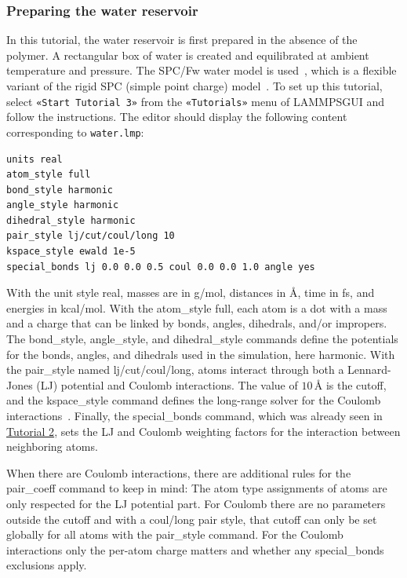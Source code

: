 \documentclass[9pt,tutorial]{livecoms}
\newcommand{\lmpcmd}[1]{\hspace{0pt}\colorbox{listing}{\textcolor{command}{\small{#1}}}\hspace{0pt}} %
\newcommand{\flecmd}[1]{\textcolor{command}{\texttt{#1}}} %
\newcommand{\guicmd}[1]{\textcolor{command}{\texttt{«#1»}}} %
\newcommand{\lammpsgui}{\textsf{LAMMPS\textendash GUI}}
\begin{document}
\subsubsection{Preparing the water reservoir}

In this tutorial, the water reservoir is first prepared in the absence of the polymer.
A rectangular box of water is created and equilibrated at ambient temperature and
pressure.  The SPC/Fw water model is used~\cite{wu2006flexible}, which is
a flexible variant of the rigid SPC (simple point charge) model~\cite{berendsen1981interaction}.
To set up this tutorial, select \guicmd{Start Tutorial 3} from the
\guicmd{Tutorials} menu of \lammpsgui{} and follow the instructions.
The editor should display the following content corresponding to \flecmd{water.lmp}:
\begin{lstlisting}
units real
atom_style full
bond_style harmonic
angle_style harmonic
dihedral_style harmonic
pair_style lj/cut/coul/long 10
kspace_style ewald 1e-5
special_bonds lj 0.0 0.0 0.5 coul 0.0 0.0 1.0 angle yes
\end{lstlisting}
With the unit style \lmpcmd{real}, masses are in g/mol, distances in Å,
time in fs, and energies in kcal/mol.  With the \lmpcmd{atom\_style
  full}, each atom is a dot with a mass and a charge that can be linked
by bonds, angles, dihedrals, and/or impropers.  The
\lmpcmd{bond\_style}, \lmpcmd{angle\_style}, and
\lmpcmd{dihedral\_style} commands define the potentials for the bonds,
angles, and dihedrals used in the simulation, here \lmpcmd{harmonic}.
With the \lmpcmd{pair\_style} named \lmpcmd{lj/cut/coul/long}, atoms
interact through both a Lennard-Jones (LJ) potential and Coulomb
interactions.  The value of $10\,\text{\AA{}}$ is the cutoff, and the
\lmpcmd{kspace\_style} command defines the long-range solver for the Coulomb
interactions~\cite{ewald1921berechnung}.  Finally, the
\lmpcmd{special\_bonds} command, which was already seen in
\hyperref[carbon-nanotube-label]{Tutorial 2}, sets the LJ and Coulomb
weighting factors for the interaction between neighboring atoms.

\begin{note} {\color{blue}When there are Coulomb interactions, there are
    additional rules for the \lmpcmd{pair\_coeff} command to keep in
    mind: The atom type assignments of atoms are only respected for the
    LJ potential part.  For Coulomb there are no parameters outside the
    cutoff and with a \lmpcmd{coul/long} pair style, that cutoff can
    only be set globally for all atoms with the \lmpcmd{pair\_style}
    command.  For the Coulomb interactions only the per-atom charge
    matters and whether any \lmpcmd{special\_bonds} exclusions apply.}
\end{note}
\end{document}
